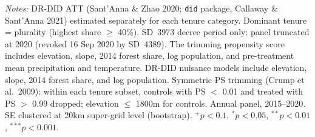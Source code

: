 \begin{table}[htbp]
\begin{tabular}{lcccccc}
\bottomrule
\end{tabular}
\begin{tablenotes}[flushleft]
\small
\item \textit{Notes:} DR-DID ATT (Sant'Anna \& Zhao 2020; \texttt{did} package, Callaway \& Sant'Anna 2021) estimated separately for each tenure category. Dominant tenure = plurality (highest share $\geq$ 40\%). SD~3973 decree period only: panel truncated at 2020 (revoked 16 Sep 2020 by SD~4389). The trimming propensity score includes elevation, slope, 2014 forest share, log population, and pre-treatment mean precipitation and temperature. DR-DID nuisance models include elevation, slope, 2014 forest share, and log population. Symmetric PS trimming (Crump et al.\ 2009): within each tenure subset, controls with PS $<$ 0.01 and treated with PS $>$ 0.99 dropped; elevation $\leq$ 1800m for controls. Annual panel, 2015--2020. SE clustered at 20km super-grid level (bootstrap). $^{+}p<0.1$, $^{*}p<0.05$, $^{**}p<0.01$, $^{***}p<0.001$.
\end{tablenotes}
\end{table}
